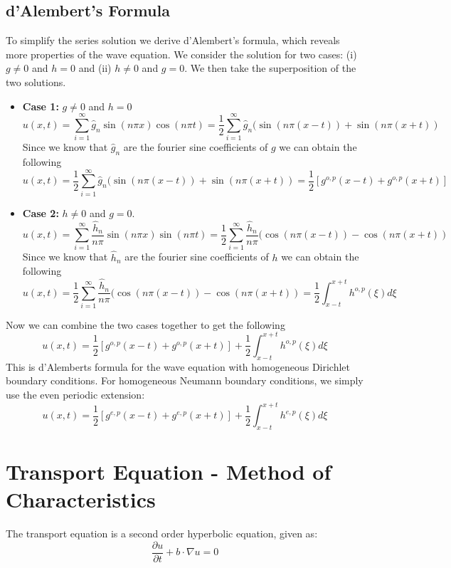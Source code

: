 \documentclass[11pt]{article}
\begin{document}
\subsection{d'Alembert's Formula}
To simplify the series solution we derive d’Alembert’s formula, which reveals more properties of the wave equation.  We consider the solution for two cases: (i) $g \neq 0$ and $h = 0$ and (ii) $h \neq 0$ and $g = 0$.  We then take the superposition of the two solutions.
\begin{itemize}
\item \textbf{Case 1:} $g \neq 0$ and $h = 0$
$$ u(x,t) = \sum_{i=1}^{\infty} \hat{g}_n \sin (n\pi x) \cos (n\pi t) = \frac{1}{2} \sum_{i=1}^{\infty} \hat{g}_n ( \sin (n\pi (x-t)) +  \sin (n\pi (x+t)) $$
Since we know that $ \hat{g}_n$ are the fourier sine coefficients of $g$ we can obtain the following 
$$ u(x,t) = \frac{1}{2} \sum_{i=1}^{\infty} \hat{g}_n ( \sin (n\pi (x-t)) +  \sin (n\pi (x+t))= \frac{1}{2} \left[ g^{o,p} (x-t) + g^{o,p} (x+t) \right] $$
\item \textbf{Case 2:} $h \neq 0$ and $g = 0$.
$$ u(x,t) = \sum_{i=1}^{\infty} \frac{\hat{h}_n}{n\pi} \sin (n\pi x) \sin (n\pi t) = \frac{1}{2} \sum_{i=1}^{\infty} \frac{\hat{h}_n}{n\pi} ( \cos (n\pi (x-t)) -  \cos (n\pi (x+t)) $$
Since we know that $ \hat{h}_n$ are the fourier sine coefficients of $h$ we can obtain the following 
$$ u(x,t) = \frac{1}{2} \sum_{i=1}^{\infty} \frac{\hat{h}_n}{n\pi} ( \cos (n\pi (x-t)) -  \cos (n\pi (x+t)) = \frac{1}{2} \int_{x-t}^{x+t} h^{o,p}(\xi) d\xi$$
\end{itemize}
Now we can  combine the two cases together to get the following
$$ u(x,t) =\frac{1}{2} \left[ g^{o,p} (x-t) + g^{o,p} (x+t) \right] + \frac{1}{2} \int_{x-t}^{x+t} h^{o,p}(\xi) d\xi $$
This is d'Alemberts formula for the wave equation with homogeneous Dirichlet boundary conditions. For homogeneous Neumann boundary conditions, we simply use the even periodic extension:
$$ u(x,t) =\frac{1}{2} \left[ g^{e,p} (x-t) + g^{e,p} (x+t) \right] + \frac{1}{2} \int_{x-t}^{x+t} h^{e,p}(\xi) d\xi $$
\pagebreak

\section{Transport Equation - Method of Characteristics}
The transport equation is a second order hyperbolic equation, given as: 
$$ \frac{\partial u}{\partial t} + b\cdot \nabla u = 0$$
\end{document}
